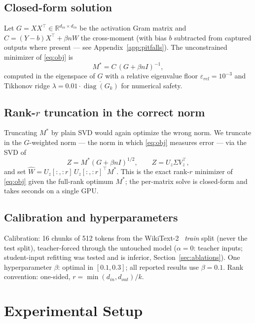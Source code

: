 \documentclass[11pt]{article}
\newcommand{\Wh}{\widehat{W}}
\begin{document}
\subsection{Closed-form solution}
Let $G = XX^\top \in \mathbb{R}^{d_{in}\times d_{in}}$ be the activation
Gram matrix and $C = (Y-b)X^\top + \beta n W$ the cross-moment (with bias
$b$ subtracted from captured outputs where present --- see
Appendix~\ref{app:pitfalls}). The unconstrained minimizer of
\eqref{eq:obj} is
\begin{equation}\label{eq:mstar}
  M^{*} = C\,(G + \beta n I)^{-1},
\end{equation}
computed in the eigenspace of $G$ with a relative eigenvalue floor
$\varepsilon_{rel} = 10^{-3}$ and Tikhonov ridge
$\lambda = 0.01 \cdot \overline{\operatorname{diag}(G_k)}$ for numerical
safety.

\subsection{Rank-$r$ truncation in the correct norm}
Truncating $M^{*}$ by plain SVD would again optimize the wrong norm. We
truncate in the $G$-weighted norm --- the norm in which \eqref{eq:obj}
measures error --- via the SVD of
\begin{equation}\label{eq:trunc}
  Z = M^{*}(G+\beta n I)^{1/2}, \qquad Z = U_z \Sigma V_z^\top,
\end{equation}
and set $\Wh = U_z[:,{:}r]\, U_z[:,{:}r]^\top M^{*}$. This is the exact
rank-$r$ minimizer of \eqref{eq:obj} given the full-rank optimum $M^{*}$;
the per-matrix solve is closed-form and takes seconds on a single GPU.

\subsection{Calibration and hyperparameters}
Calibration: 16 chunks of 512 tokens from the WikiText-2~\cite{merity2016} \emph{train}
split (never the test split), teacher-forced through the untouched model
($\alpha = 0$: teacher inputs; student-input refitting was tested and is
inferior, Section~\ref{sec:ablations}). One hyperparameter $\beta$:
optimal in $[0.1, 0.3]$; all reported results use $\beta = 0.1$. Rank
convention: one-sided, $r = \min(d_{in}, d_{out})/k$.

\section{Experimental Setup}
\end{document}
